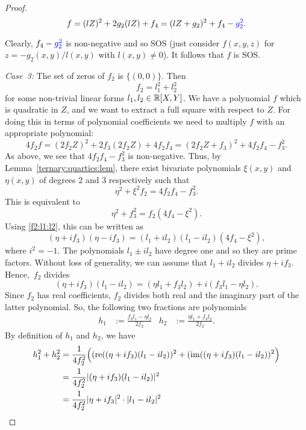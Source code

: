 \begin{proof}
	\[
		f = (l Z)^2 + 2 g_2 (l Z) + f_4 = (l Z + g_2)^2 + f_4 - \textcolor{blue}{g_2^2. }
	\]
	
	Clearly, $f_4 - \textcolor{blue}{g_2^2}$ is non-negative and so SOS (just consider $f(x,y,z)$ for $z= - g_2(x,y) / l(x,y)$ with $l(x,y) \ne 0$). It follows that $f$ is SOS. 
	
\smallskip
	\emph{Case~3:} The set of zeros of $f_2$ is $\{(0,0)\}$. Then 
	\begin{equation}
		\label{f2:l1:l2}
		f_2 = l_1^2 + l_2^2
	\end{equation} 
	for some non-trivial linear forms $l_1, l_2 \in \mathbb{R}[X,Y]$. We have a polynomial $f$ which is quadratic in $Z$, and we want to extract a full square with respect to $Z$. For doing this in terms of polynomial coefficients we need to multiply $f$ with an appropriate polynomial: 
	\[
		4 f_2 f = (2 f_2 Z)^2 + 2 f_3 ( 2 f_2 Z) + 4 f_2 f_4 = (2 f_2 Z + f_3)^2 + 4 f_2 f_4 - f_3^2.
	\]
	As above, we see that $4 f_2 f_4 - f_3^2$ is non-negative. Thus, by Lemma~\ref{ternary:quartics:lem}, there exist bivariate polynomials $\xi(x,y)$ and $\eta(x,y)$ of degrees $2$ and $3$ respectively such that 
	\[
		\eta^2 + \xi^2 f_2 = 4 f_2 f_4 - f_3^2.
	\] 
	This is equivalent to
	\begin{equation}
		\label{eta:f3}
		\eta^2 +f_3^2 = f_2 (4 f_4 - \xi^2). 
	\end{equation}
	Using \eqref{f2:l1:l2}, this can be written as 
	\[
	(\eta + i f_3)(\eta - i f_3) = (l_1 + i l_2) (l_1 - i l_2)( 4 f_4 - \xi^2),
	\]
	where $i^2 = -1$. The polynomials $l_1 \pm i l_2$ have degree one and so they are prime factors. Without loss of generality, we can assume that $l_1 + i l_2$ divides $\eta + i f_3$. Hence,~$f_2$ divides 
	\[
		(\eta+ i f_3) (l_1 - i l_2) = (\eta l_1 + f_3 l_2) + i ( f_3 l_1 - \eta l_2).
	\]
	Since $f_2$ has real coefficients, $f_2$ divides both real and the imaginary part of the latter polynomial. So, the following two fractions are polynomials
	\begin{align*}
		h_1 & := \frac{f_3 l_1 - \eta l_2}{2 f_2} &  h_2 &:= \frac{\eta l_1 + f_3 l_2}{2 f_2}.
	\end{align*}
	By definition of $h_1$ and $h_2$, we have 
	\begin{align*}
		h_1^2 + h_2^2 & = \frac{1}{4 f_2^2} \Bigl((\re ((\eta+i f_3)(l_1-il_2))^2 +  (\im ((\eta+ i f_3)(l_1 - i l_2))^2 \Bigr) 
		\\ & = \frac{1}{4 f_2^2}|(\eta+ i f_3)(l_1 - i l_2)|^2 
		\\ & = \frac{1}{4 f_2^2}|\eta+ i f_3|^2 \cdot |l_1 - i l_2|^2

\end{align*}
\end{proof}
